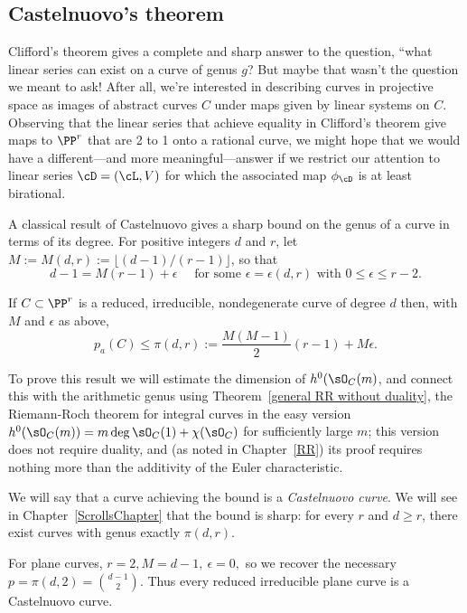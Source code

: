 \subsection{Castelnuovo's theorem}

Clifford's theorem gives a complete and sharp answer to the question, ``what linear series can exist on a curve of genus $g$?
But maybe that wasn't the question we meant to ask! After all, we're interested in describing curves in projective space as images of abstract curves $C$ under maps given by linear systems on $C$. Observing that the linear series that achieve equality in Clifford's theorem give maps to $\PP^r$ that are 2 to 1 onto a rational curve, we might hope that we would have a different---and more meaningful---answer if we  restrict our attention to linear series $\cD = (\cL,V)$ for which the associated map $\phi_\cD$ is at least  birational. 

A classical result of Castelnuovo gives a sharp bound on the genus of a curve in terms of its degree. For positive integers $d$ and $r$, let $M := M(d,r) := \lfloor(d-1)/(r-1)\rfloor$, so that
$$
 d -1 = M(r-1) + \epsilon \quad \text{ for some $\epsilon = \epsilon(d,r)$ with }0 \leq \epsilon \leq r-2. 
$$

\begin{theorem}\label{Castelnuovo's bound}
If $C \subset \PP^r$ is a reduced, irreducible, nondegenerate curve of degree $d$ then, with $M$ and $\epsilon$
as above,
$$
p_a(C) \leq \pi(d,r) := \frac{M(M-1)}{2}(r-1) + M\epsilon.
$$
\end{theorem}

To prove this result we will estimate the dimension of $h^0(\sO_C(m)$, and connect this with the 
arithmetic genus using Theorem~\ref{general RR without duality}, the Riemann-Roch theorem for integral curves
in the easy version $h^0(\sO_C(m)) = m\deg \sO_C(1) + \chi(\sO_C)$ for sufficiently large $m$; this version
does not require duality, and (as noted in Chapter~\ref{RR}) its proof requires nothing more than the additivity
of the Euler characteristic. 

We will say that a curve achieving the bound is a \emph{Castelnuovo curve}. We will see in Chapter~\ref{ScrollsChapter} that the bound is sharp: for every $r$ and $d \geq r$, there exist curves with genus exactly $\pi(d,r)$. 

\begin{example}
For plane curves, $r=2, M = d-1, \ \epsilon = 0,$ so we recover the necessary $p = \pi(d,2) =  {d-1\choose 2}$. Thus every reduced irreducible
plane curve is a Castelnuovo curve.
\end{example}


